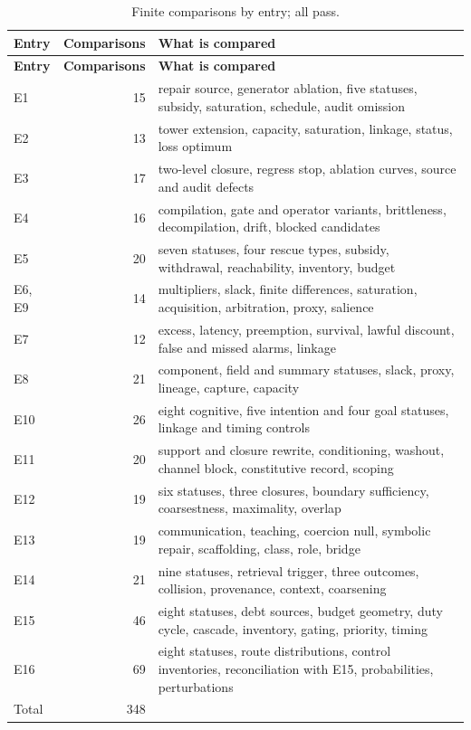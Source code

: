 {\small
\begin{longtable}{@{}lr>{\raggedright\arraybackslash}p{10.6cm}@{}}
\caption{Finite comparisons by entry; all pass.}\label{tab:census}\\
\toprule
\textbf{Entry} & \textbf{Comparisons} & \textbf{What is compared} \\
\midrule
\endfirsthead
\toprule
\textbf{Entry} & \textbf{Comparisons} & \textbf{What is compared} \\
\midrule
\endhead
\bottomrule
\endfoot
E1 & 15 & repair source, generator ablation, five statuses, subsidy, saturation, schedule, audit
omission \\
E2 & 13 & tower extension, capacity, saturation, linkage, status, loss optimum \\
E3 & 17 & two-level closure, regress stop, ablation curves, source and audit defects \\
E4 & 16 & compilation, gate and operator variants, brittleness, decompilation, drift, blocked
candidates \\
E5 & 20 & seven statuses, four rescue types, subsidy, withdrawal, reachability, inventory, budget \\
E6, E9 & 14 & multipliers, slack, finite differences, saturation, acquisition, arbitration, proxy,
salience \\
E7 & 12 & excess, latency, preemption, survival, lawful discount, false and missed alarms, linkage \\
E8 & 21 & component, field and summary statuses, slack, proxy, lineage, capture, capacity \\
E10 & 26 & eight cognitive, five intention and four goal statuses, linkage and timing controls \\
E11 & 20 & support and closure rewrite, conditioning, washout, channel block, constitutive record,
scoping \\
E12 & 19 & six statuses, three closures, boundary sufficiency, coarsestness, maximality, overlap \\
E13 & 19 & communication, teaching, coercion null, symbolic repair, scaffolding, class, role, bridge \\
E14 & 21 & nine statuses, retrieval trigger, three outcomes, collision, provenance, context,
coarsening \\
E15 & 46 & eight statuses, debt sources, budget geometry, duty cycle, cascade, inventory, gating,
priority, timing \\
E16 & 69 & eight statuses, route distributions, control inventories, reconciliation with E15,
probabilities, perturbations \\
\midrule
Total & 348 & \\
\end{longtable}
}

